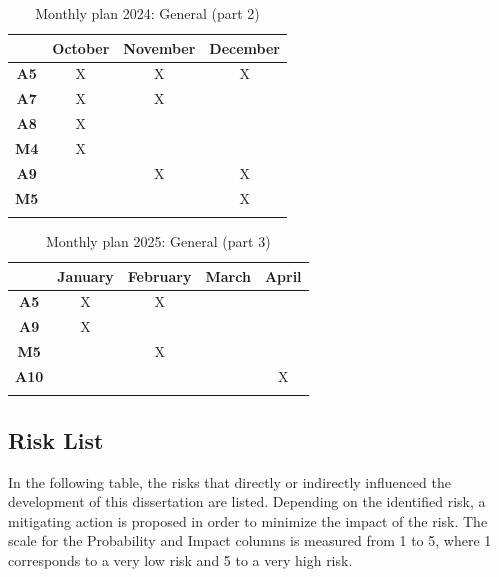 \begin{longtable}{| c | c | c | c |}
\hline
& \textbf{October} & \textbf{November} & \textbf{December} \\ \hline

    \textbf{A5} & X & X & X \\ \hline

    \textbf{A7} & X & X &  \\ \hline

    \textbf{A8} & X & &   \\ \hline
    
    \textbf{M4} & X & &  \\ \hline

    \textbf{A9} & & X & X \\ \hline
    
    \textbf{M5} & & & X \\ \hline
    \caption{Monthly plan 2024: General (part 2)} \label{tab:activity_schedule} 
\end{longtable}

\begin{longtable}{| c | c | c | c | c |}
\hline
& \textbf{January} & \textbf{February} & \textbf{March} & \textbf{April}\\ \hline

    \textbf{A5} & X & X & &\\ \hline

    \textbf{A9} & X & & &\\ \hline

    \textbf{M5} & & X & & \\ \hline
    
    \textbf{A10} & & & & X \\ \hline
    \caption{Monthly plan 2025: General (part 3)} \label{tab:activity_schedule} 
\end{longtable}

\subsection{Risk List}

In the following table, the risks that directly or indirectly influenced the development of this dissertation are listed. Depending on the identified risk, a mitigating action is proposed in order to minimize the impact of the risk. The scale for the Probability and Impact columns is measured from 1 to 5, where 1 corresponds to a very low risk and 5 to a very high risk.

